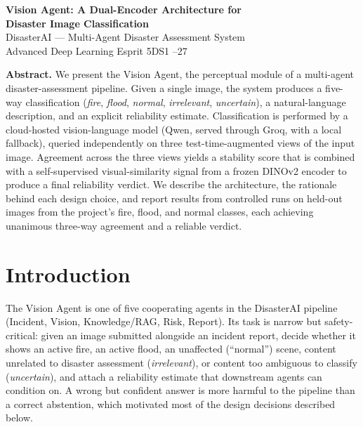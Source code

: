 \documentclass[11pt, a4paper]{article}
\begin{document}

\begin{center}
  {\LARGE\bfseries Vision Agent: A Dual-Encoder Architecture for\\[2pt]
   Disaster Image Classification}\\[10pt]
  {\large DisasterAI --- Multi-Agent Disaster Assessment System}\\[4pt]
  {\normalsize Advanced Deep Learning \quad\textbar\quad Esprit 5DS1 \quad\textbar{}--27}
\end{center}

\vspace{6pt}
\begin{center}
\begin{minipage}{0.88\textwidth}
\small\noindent\textbf{Abstract.} We present the Vision Agent, the perceptual module of a
multi-agent disaster-assessment pipeline. Given a single image, the system produces a
five-way classification (\emph{fire}, \emph{flood}, \emph{normal}, \emph{irrelevant},
\emph{uncertain}), a natural-language description, and an explicit reliability estimate.
Classification is performed by a cloud-hosted vision-language model (Qwen, served through
Groq, with a local fallback), queried independently on three test-time-augmented views of
the input image. Agreement across the three views yields a stability score that is combined
with a self-supervised visual-similarity signal from a frozen DINOv2 encoder to produce a
final reliability verdict. We describe the architecture, the rationale behind each design
choice, and report results from controlled runs on held-out images from the project's fire,
flood, and normal classes, each achieving unanimous three-way agreement and a reliable
verdict.
\end{minipage}
\end{center}

\vspace{4pt}

\section{Introduction}

The Vision Agent is one of five cooperating agents in the DisasterAI pipeline (Incident,
Vision, Knowledge/RAG, Risk, Report). Its task is narrow but safety-critical: given an image
submitted alongside an incident report, decide whether it shows an active fire, an active
flood, an unaffected (``normal'') scene, content unrelated to disaster assessment
(\emph{irrelevant}), or content too ambiguous to classify (\emph{uncertain}), and attach a
reliability estimate that downstream agents can condition on. A wrong but confident answer is
more harmful to the pipeline than a correct abstention, which motivated most of the design
decisions described below.
\end{document}
